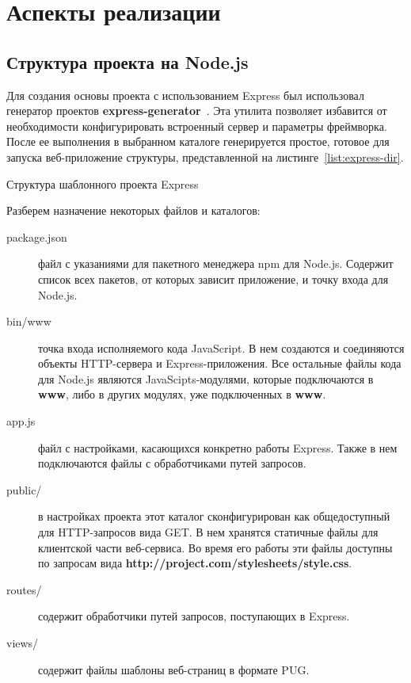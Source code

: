 \section{Аспекты реализации}
\subsection{Структура проекта на Node.js}
\label{subsec:project_structuture}
Для создания основы проекта с использованием Express был использовал генератор проектов \textbf{express-generator}~\autocite{npm}. Эта утилита позволяет избавится от необходимости конфигурировать встроенный сервер и параметры фреймворка. После ее выполнения в выбранном каталоге генерируется простое, готовое для запуска веб-приложение структуры, представленной на листинге~\ref{list:express-dir}.
\begin{ListingEnv}
\caption{Структура шаблонного проекта Express}
\label{list:express-dir}   
\end{ListingEnv}

 Разберем назначение некоторых файлов и каталогов:
 \begin{description}
 	\item[package.json] файл с указаниями для пакетного менеджера npm для Node.js. Содержит список всех пакетов, от которых зависит приложение, и точку входа для Node.js.  
 	\item[bin/www] точка входа исполняемого кода JavaScript. В нем создаются и соединяются объекты HTTP-сервера и Express-приложения. Все остальные файлы кода для Node.js являются JavaScipts-модулями, которые подключаются в \textbf{www}, либо в других модулях, уже подключенных в \textbf{www}.
 	\item[app.js] файл с настройками, касающихся конкретно работы Express. Также в нем подключаются файлы с обработчиками путей запросов.   
 	\item[public/] в настройках проекта этот каталог сконфигурирован как общедоступный для  HTTP-запросов вида GET. В нем хранятся статичные файлы для клиентской части веб-сервиса. Во время его работы эти файлы доступны по запросам вида \textbf{http://project.com/stylesheets/style.css}.
 	\item[routes/]   содержит обработчики путей запросов, поступающих в Express.
 	\item[views/]   содержит файлы шаблоны веб-страниц в формате PUG.  
 \end{description}



